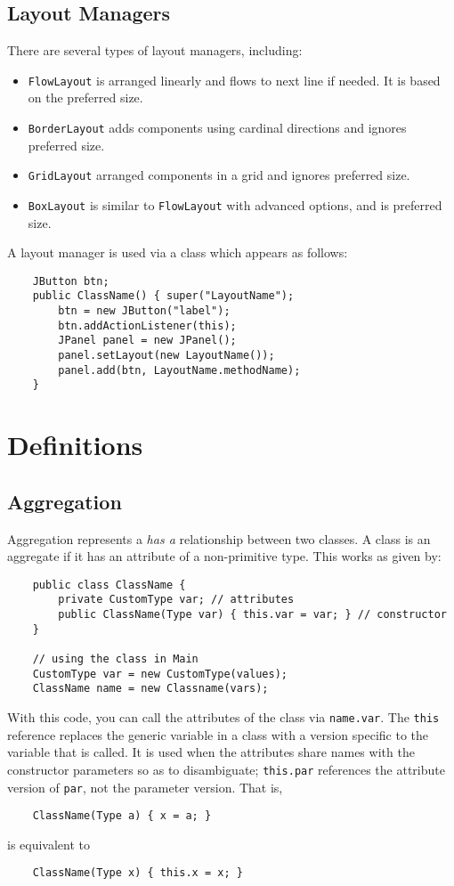 \documentclass[letterpaper, openany, justified]{tufte-book}
\newcommand{\cd}[1]{\lstinline{#1}}
\begin{document}
\begin{fullwidth}
\section{Layout Managers}
There are several types of layout managers, including:
\begin{itemize}
    \item \cd{FlowLayout} is arranged linearly and flows to next line if needed. It is based on the preferred size.
    \item \cd{BorderLayout} adds components using cardinal directions and ignores preferred size.
    \item \cd{GridLayout} arranged components in a grid and ignores preferred size.
    \item \cd{BoxLayout} is similar to \cd{FlowLayout} with advanced options, and is preferred size.
\end{itemize}
A layout manager is used via a class which appears as follows:
\begin{lstlisting}
    JButton btn;
    public ClassName() { super("LayoutName");
        btn = new JButton("label");
        btn.addActionListener(this);
        JPanel panel = new JPanel();
        panel.setLayout(new LayoutName());
        panel.add(btn, LayoutName.methodName);
    }
\end{lstlisting}

\chapter{Definitions}

\section{Aggregation}
Aggregation represents a \textit{has a} relationship between two classes. A class is an aggregate if it has an attribute of a non-primitive type. This works as given by:
\begin{lstlisting}
    public class ClassName {
        private CustomType var; // attributes
        public ClassName(Type var) { this.var = var; } // constructor
    }

    // using the class in Main
    CustomType var = new CustomType(values);
    ClassName name = new Classname(vars);
\end{lstlisting}
With this code, you can call the attributes of the class via \cd{name.var}. The \cd{this} reference replaces the generic variable in a class with a version specific to the variable that is called. It is used when the attributes share names with the constructor parameters so as to disambiguate; \cd{this.par} references the attribute version of \cd{par}, not the parameter version. That is,
\begin{lstlisting}
    ClassName(Type a) { x = a; }
\end{lstlisting}
is equivalent to
\begin{lstlisting}
    ClassName(Type x) { this.x = x; }
\end{lstlisting}


\end{fullwidth}
\end{document}
